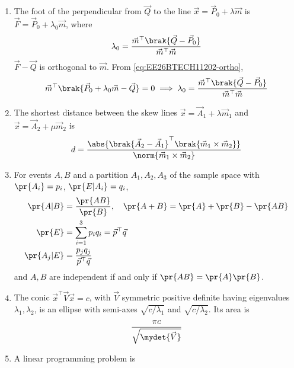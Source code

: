 \begin{enumerate}[label=\thesubsection.\arabic*, ref=\thesubsection.\theenumi]
\begin{align}
	\cos\theta = \frac{\vec{m}_1^{\top}\vec{m}_2}{\norm{\vec{m}_1}\norm{\vec{m}_2}}
	\label{eq:EE26BTECH11202-angle}
\end{align}
\item The foot of the perpendicular from $\vec{Q}$ to the line $\vec{x} = \vec{P}_0 + \lambda\vec{m}$ is $\vec{F} = \vec{P}_0 + \lambda_0\vec{m}$, where
\begin{align}
	\lambda_0 = \frac{\vec{m}^{\top}\brak{\vec{Q}-\vec{P}_0}}{\vec{m}^{\top}\vec{m}}
	\label{eq:EE26BTECH11202-foot}
\end{align}
\solution
$\vec{F}-\vec{Q}$ is orthogonal to $\vec{m}$. From \eqref{eq:EE26BTECH11202-ortho},
\begin{align}
	\vec{m}^{\top}\brak{\vec{P}_0 + \lambda_0\vec{m} - \vec{Q}} = 0
	\implies \lambda_0 = \frac{\vec{m}^{\top}\brak{\vec{Q}-\vec{P}_0}}{\vec{m}^{\top}\vec{m}}
\end{align}
\item The shortest distance between the skew lines $\vec{x} = \vec{A}_1 + \lambda\vec{m}_1$ and $\vec{x} = \vec{A}_2 + \mu\vec{m}_2$ is
\begin{align}
	d = \frac{\abs{\brak{\vec{A}_2-\vec{A}_1}^{\top}\brak{\vec{m}_1\times\vec{m}_2}}}{\norm{\vec{m}_1\times\vec{m}_2}}
	\label{eq:EE26BTECH11202-skew}
\end{align}
\item For events $A, B$ and a partition $A_1, A_2, A_3$ of the sample space with $\pr{A_i}=p_i$, $\pr{E\vert A_i}=q_i$,
\begin{align}
	\pr{A\vert B} &= \frac{\pr{AB}}{\pr{B}}, \quad \pr{A+B} = \pr{A}+\pr{B}-\pr{AB}
	\label{eq:EE26BTECH11202-cond}
	\\
	\pr{E} &= \sum_{i=1}^{3} p_i q_i = \vec{p}^{\top}\vec{q}
	\label{eq:EE26BTECH11202-total}
	\\
	\pr{A_j\vert E} &= \frac{p_j q_j}{\vec{p}^{\top}\vec{q}}
	\label{eq:EE26BTECH11202-bayes}
\end{align}
and $A, B$ are independent if and only if $\pr{AB} = \pr{A}\pr{B}$.
\item The conic $\vec{x}^{\top}\vec{V}\vec{x} = c$, with $\vec{V}$ symmetric positive definite having eigenvalues $\lambda_1, \lambda_2$, is an ellipse with semi-axes $\sqrt{c/\lambda_1}$ and $\sqrt{c/\lambda_2}$. Its area is
\begin{align}
	\frac{\pi c}{\sqrt{\mydet{\vec{V}}}}
	\label{eq:EE26BTECH11202-ellipse}
\end{align}
\item A linear programming problem is

\end{enumerate}

